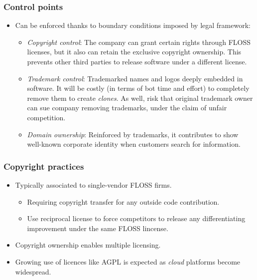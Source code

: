 
\begin{frame}
 \frametitle{Control points}
\begin{itemize}
 \item Can be enforced thanks to boundary conditions imposed by legal framework:
 \begin{itemize}
  \item \textit{Copyright control}: The company can grant certain rights through FLOSS licenses, but it also
can retain the exclusive copyright ownership. This prevents other third parties to release software under
a different license.
  \item \textit{Trademark control}: Trademarked names and logos deeply embedded in software. It will be costly 
(in terms of bot time and effort) to completely remove them to create \textit{clones}. As well, risk that 
original trademark owner can sue company removing trademarks, under the claim of unfair competition.
  \item \textit{Domain ownership}: Reinforced by trademarks, it contributes to show well-known corporate identity when customers
search for information.
 \end{itemize}
\end{itemize}

\end{frame}


\begin{frame}
 \frametitle{Copyright practices}
\begin{itemize}
 \item Typically associated to single-vendor FLOSS firms.
 \begin{itemize}
  \item Requiring copyright transfer for any outside code contribution.
  \item Use reciprocal license to force competitors to release any differentiating improvement
under the same FLOSS lincense.
 \end{itemize}
  \item Copyright ownership enables multiple licensing.
  \item Growing use of licences like AGPL is expected as \textit{cloud} platforms become widespread.
\end{itemize}

\end{frame}

